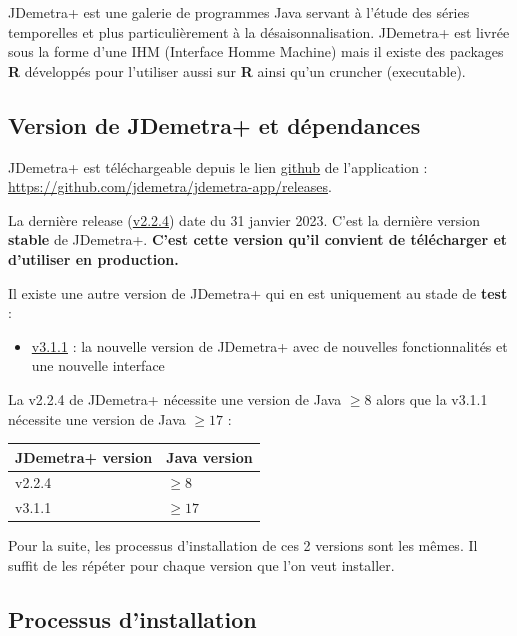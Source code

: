 \documentclass[
]{article}
\providecommand{\tightlist}{%
  \setlength{\itemsep}{0pt}\setlength{\parskip}{0pt}}
\begin{document}
JDemetra+ est une galerie de programmes Java servant à l'étude des
séries temporelles et plus particulièrement à la désaisonnalisation.
JDemetra+ est livrée sous la forme d'une IHM (Interface Homme Machine)
mais il existe des packages \textbf{R} développés pour l'utiliser aussi
sur \textbf{R} ainsi qu'un cruncher (executable).

\hypertarget{version-de-jdemetra-et-duxe9pendances}{%
\subsection{Version de JDemetra+ et
dépendances}\label{version-de-jdemetra-et-duxe9pendances}}

JDemetra+ est téléchargeable depuis le lien
\href{https://github.com/jdemetra/jdemetra-app/releases}{github} de
l'application :
\textcolor{html_color}{\url{https://github.com/jdemetra/jdemetra-app/releases}}.

La dernière release
(\href{https://github.com/jdemetra/jdemetra-app/releases/tag/v2.2.4}{v2.2.4})
date du 31 janvier 2023. C'est la dernière version \textbf{stable} de
JDemetra+. \textbf{C'est cette version qu'il convient de télécharger et
d'utiliser en production.}

Il existe une autre version de JDemetra+ qui en est uniquement au stade
de \textbf{test} :

\begin{itemize}
\tightlist
\item
  \href{https://github.com/jdemetra/jdplus-main/releases/tag/v3.1.1}{v3.1.1}
  : la nouvelle version de JDemetra+ avec de nouvelles fonctionnalités
  et une nouvelle interface
\end{itemize}

La v2.2.4 de JDemetra+ nécessite une version de Java \(\geq 8\) alors
que la v3.1.1 nécessite une version de Java \(\geq 17\) :

\begin{longtable}[]{@{}ll@{}}
\toprule()
JDemetra+ version & Java version \\
\midrule()
\endhead
v2.2.4 & \(\geq 8\) \\
v3.1.1 & \(\geq 17\) \\
\bottomrule()
\end{longtable}

Pour la suite, les processus d'installation de ces 2 versions sont les
mêmes. Il suffit de les répéter pour chaque version que l'on veut
installer.

\hypertarget{processus-dinstallation}{%
\subsection{Processus d'installation}\label{processus-dinstallation}}
\end{document}
